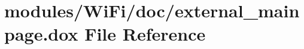 \hypertarget{external__mainpage_8dox}{}\section{modules/\+Wi\+Fi/doc/external\+\_\+mainpage.dox File Reference}
\label{external__mainpage_8dox}
